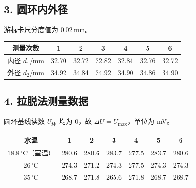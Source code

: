 \subsection*{3. 圆环内外径}

游标卡尺分度值为 $0.02\,\mathrm{mm}$。

\begin{center}\small
\begin{tabular}{ccccccc}
\toprule
测量次数 & 1 & 2 & 3 & 4 & 5 & 6 \\
\midrule
内径 $d_1$/mm & 32.70 & 32.72 & 32.82 & 32.84 & 32.76 & 32.72 \\
外径 $d_2$/mm & 34.92 & 34.84 & 34.92 & 34.90 & 34.86 & 34.90 \\
\bottomrule\end{tabular}\end{center}

\subsection*{4. 拉脱法测量数据}

圆环基线读数 $U_{\text{环}}$ 均为 0，故 $\Delta U=U_{\max}$，单位为 mV。

\begin{center}\small
\begin{tabular}{ccccccc}
\toprule
水温 & 1 & 2 & 3 & 4 & 5 & 6 \\
\midrule
$18.8\,{}^\circ\mathrm{C}$（室温） & 280.6 & 280.6 & 283.7 & 277.5 & 283.7 & 280.6 \\
$26\,{}^\circ\mathrm{C}$ & 274.3 & 271.2 & 274.3 & 277.5 & 274.3 & 274.3 \\
$35\,{}^\circ\mathrm{C}$ & 268.7 & 271.8 & 265.6 & 271.8 & 268.7 & 268.7 \\
\bottomrule\end{tabular}\end{center}

\clearpage

